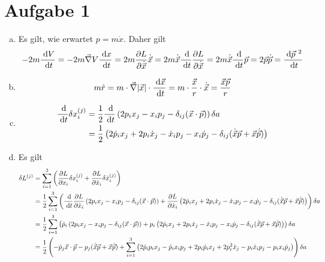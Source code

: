 \documentclass{article}
\theoremstyle{definition}
\begin{document}
\section*{Aufgabe 1}
\begin{enumerate}[(a)]
    \item Es gilt, wie erwartet $p = m\dot x$. Daher gilt 
    $$-2m\frac{\d V}{\d t} = -2m \vec\nabla V \frac{\d x}{\d t} = 2m \frac{\partial L}{\partial \dot{\vec{x}}} \dot{\vec{x}} = 2m \dot{\vec{x}} \frac{\d}{\d t} \frac{\partial L}{\partial \dot{\vec{x}}} = 2m \dot{\vec{x}}\frac{\d}{\d t} \vec{p} = 2\vec{p} \dot{\vec{p}} = \frac{\d{} \vec{p}^{\ 2}}{\d{} t}$$
    \item $$m\dot r = m \cdot \vec{\nabla} |\vec{x}| \cdot \frac{\d{}\vec{x}}{\d{} t} = m \cdot \frac{\vec{x}}{r}\cdot \dot{\vec{x}} = \frac{\vec{x}\vec{p}}{r}$$
    \item 
    \begin{align*}
        \frac{\d{}}{\d{t}} \delta x_i^{(j)} &= \frac{1}{2}\frac{\d{}}{\d{t}}\left(2p_ix_j - x_ip_j - \delta_{ij}(\vec{x}\cdot \vec{p})\right)\delta a\\
        &= \frac{1}{2} \left(2\dot p_i x_j + 2p_i\dot x_j - \dot x_ip_j - x_i\dot p_j - \delta_{ij}(\dot{\vec{x}}\vec{p} + \vec{x}\dot{\vec{p}})\right)
    \end{align*}
    \item Es gilt
    \begin{align*}
        \delta L^{(j)} &= \sum_{i = 1}^{3}\left(\frac{\partial L}{\partial x_i}\delta x_i^{(j)} + \frac{\partial L }{\partial \dot x_i}\delta \dot x_i^{(j)}\right)\\
        &= \frac{1}{2}\sum_{i = 1}^{3}\left(\frac{\d}{\d{t}}\frac{\partial L}{\partial \dot x_i}\left(2p_ix_j - x_ip_j - \delta_{ij}(\vec{x}\cdot \vec{p})\right) + \frac{\partial L }{\partial \dot x_i} \left(2\dot p_i x_j + 2p_i\dot x_j - \dot x_ip_j - x_i\dot p_j - \delta_{ij}(\dot{\vec{x}}\vec{p} + \vec{x}\dot{\vec{p}})\right)\right)\delta a\\
        &=\frac{1}{2}\sum_{i = 1}^{3}\left(\dot p_i\left(2p_ix_j - x_ip_j - \delta_{ij}(\vec{x}\cdot \vec{p})\right) + p_i \left(2\dot p_i x_j + 2p_i\dot x_j - \dot x_ip_j - x_i\dot p_j - \delta_{ij}(\dot{\vec{x}}\vec{p} + \vec{x}\dot{\vec{p}})\right)\right)\delta a\\
        &=\frac{1}{2}\left( - \dot p_j \vec{x}\cdot \vec{p} - p_j (\dot{\vec{x}}\vec{p} + \vec{x}\dot{\vec{p}}) + \sum_{i = 1}^{3}\left(2 \dot p_ip_ix_j - \dot p_ix_ip_j + 2p_i\dot p_i x_j+ 2p_i^2\dot x_j - p_i \dot x_ip_j - p_ix_i\dot p_j\right)\right)\delta a\\

\end{align*}
\end{enumerate}
\end{document}
